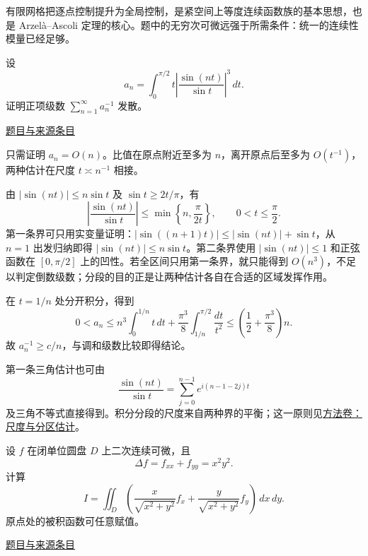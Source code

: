 \documentclass[12pt,fontset=fandol]{ctexart}
\begin{document}
\begin{remark}[方法与条件]有限网格把逐点控制提升为全局控制，是紧空间上等度连续函数族的基本思想，也是 Arzelà--Ascoli 定理的核心。题中的无穷次可微远强于所需条件：统一的连续性模量已经足够。\end{remark}

\begin{example}[来源序号5]\label{ex:pre01-math:5}\label{pr:pre01-math:5}

设
\[
a_n=\int_0^{\pi/2}t\left|\frac{\sin(nt)}{\sin t}\right|^3\,dt.
\]
证明正项级数 $\sum_{n=1}^\infty a_n^{-1}$ 发散。

\par\href{https://github.com/lzxcr/cmc-mathematics/blob/64916fa1fdbc3e444a652eca204d5669058ee321/src/problems/preliminary/01/05.md}{题目与来源条目}

\end{example}

\begin{solve}\label{ans:pre01-math:5}

只需证明 $a_n=O(n)$。比值在原点附近至多为 $n$，离开原点后至多为 $O(t^{-1})$，两种估计在尺度 $t\asymp n^{-1}$ 相接。

由 $|\sin(nt)|\le n\sin t$ 及 $\sin t\ge2t/\pi$，有
\[
\left|\frac{\sin(nt)}{\sin t}\right|
\le\min\left\{n,\frac{\pi}{2t}\right\},\qquad 0<t\le\frac\pi2.
\]
第一条界可只用实变量证明：$|\sin((n+1)t)|\le |\sin(nt)|+\sin t$，从 $n=1$ 出发归纳即得 $|\sin(nt)|\le n\sin t$。第二条界使用 $|\sin(nt)|\le1$ 和正弦函数在 $[0,\pi/2]$ 上的凹性。若全区间只用第一条界，就只能得到 $O(n^3)$，不足以判定倒数级数；分段的目的正是让两种估计各自在合适的区域发挥作用。

在 $t=1/n$ 处分开积分，得到
\[
0<a_n\le n^3\int_0^{1/n}t\,dt
+\frac{\pi^3}{8}\int_{1/n}^{\pi/2}\frac{dt}{t^2}
\le\left(\frac12+\frac{\pi^3}{8}\right)n.
\]
故 $a_n^{-1}\ge c/n$，与调和级数比较即得结论。

\end{solve}

\begin{remark}[方法与条件]第一条三角估计也可由
\[
\frac{\sin(nt)}{\sin t}
=\sum_{j=0}^{n-1}e^{i(n-1-2j)t}
\]
及三角不等式直接得到。积分分段的尺度来自两种界的平衡；这一原则见\hyperref[app:estimate-scaling]{方法卷：尺度与分区估计}。\end{remark}

\begin{example}[来源序号6]\label{ex:pre01-math:6}\label{pr:pre01-math:6}

设 $f$ 在闭单位圆盘 $D$ 上二次连续可微，且
\[
\Delta f=f_{xx}+f_{yy}=x^2y^2.
\]
计算
\[
I=\iint_D\left(
\frac{x}{\sqrt{x^2+y^2}}f_x+
\frac{y}{\sqrt{x^2+y^2}}f_y
\right)\,dx\,dy.
\]
原点处的被积函数可任意赋值。

\par\href{https://github.com/lzxcr/cmc-mathematics/blob/64916fa1fdbc3e444a652eca204d5669058ee321/src/problems/preliminary/01/06.md}{题目与来源条目}

\end{example}
\end{document}
